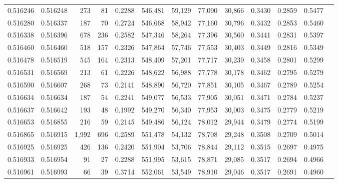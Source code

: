 \begin{tabular}{rrrrrrrrrrrrr}
0.516246 & 0.516248 &   273 &    81 &                                     0.2288 & 546,481 &  59,129 &  77,090 &  30,866 & 0.3430 & 0.2859 & 0.5477 \\
0.516280 & 0.516337 &   187 &    70 &                                     0.2724 & 546,668 &  58,942 &  77,160 &  30,796 & 0.3432 & 0.2853 & 0.5460 \\
0.516338 & 0.516396 &   678 &   236 &                                     0.2582 & 547,346 &  58,264 &  77,396 &  30,560 & 0.3441 & 0.2831 & 0.5397 \\
0.516460 & 0.516460 &   518 &   157 &                                     0.2326 & 547,864 &  57,746 &  77,553 &  30,403 & 0.3449 & 0.2816 & 0.5349 \\
0.516478 & 0.516519 &   545 &   164 &                                     0.2313 & 548,409 &  57,201 &  77,717 &  30,239 & 0.3458 & 0.2801 & 0.5299 \\
0.516531 & 0.516569 &   213 &    61 &                                     0.2226 & 548,622 &  56,988 &  77,778 &  30,178 & 0.3462 & 0.2795 & 0.5279 \\
0.516590 & 0.516607 &   268 &    73 &                                     0.2141 & 548,890 &  56,720 &  77,851 &  30,105 & 0.3467 & 0.2789 & 0.5254 \\
0.516634 & 0.516634 &   187 &    54 &                                     0.2241 & 549,077 &  56,533 &  77,905 &  30,051 & 0.3471 & 0.2784 & 0.5237 \\
0.516637 & 0.516642 &   193 &    48 &                                     0.1992 & 549,270 &  56,340 &  77,953 &  30,003 & 0.3475 & 0.2779 & 0.5219 \\
0.516653 & 0.516855 &   216 &    59 &                                     0.2145 & 549,486 &  56,124 &  78,012 &  29,944 & 0.3479 & 0.2774 & 0.5199 \\
0.516865 & 0.516915 & 1,992 &   696 &                                     0.2589 & 551,478 &  54,132 &  78,708 &  29,248 & 0.3508 & 0.2709 & 0.5014 \\
0.516925 & 0.516925 &   426 &   136 &                                     0.2420 & 551,904 &  53,706 &  78,844 &  29,112 & 0.3515 & 0.2697 & 0.4975 \\
0.516933 & 0.516954 &    91 &    27 &                                     0.2288 & 551,995 &  53,615 &  78,871 &  29,085 & 0.3517 & 0.2694 & 0.4966 \\
0.516961 & 0.516993 &    66 &    39 &                                     0.3714 & 552,061 &  53,549 &  78,910 &  29,046 & 0.3517 & 0.2691 & 0.4960 \\

\end{tabular}
